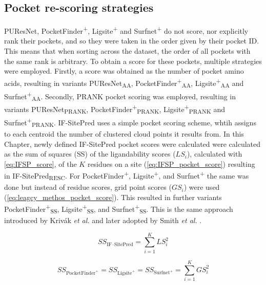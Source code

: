 \subsection{Pocket re-scoring strategies}

PUResNet, PocketFinder\textsuperscript{+}, Ligsite\textsuperscript{+} and Surfnet\textsuperscript{+} do not score, nor explicitly rank their pockets, and so they were taken in the order given by their pocket ID. This means that when sorting across the dataset, the order of all pockets with the same rank is arbitrary. To obtain a score for these pockets, multiple strategies were employed. Firstly, a score was obtained as the number of pocket amino acids, resulting in variants PUResNet\textsubscript{AA}, PocketFinder\textsuperscript{+}\textsubscript{AA}, Ligsite\textsuperscript{+}\textsubscript{AA} and Surfnet\textsuperscript{+}\textsubscript{AA}. Secondly, PRANK pocket scoring was employed, resulting in variants PUResNet\textsubscript{PRANK}, PocketFinder\textsuperscript{+}\textsubscript{PRANK}, Ligsite\textsuperscript{+}\textsubscript{PRANK} and Surfnet\textsuperscript{+}\textsubscript{PRANK}. IF-SitePred uses a simple pocket scoring scheme, whtih assigns to each centroid the number of clustered cloud points it results from. In this Chapter, newly defined IF-SitePred pocket scores were calculated were calculated as the sum of squares (SS) of the ligandability scores ($LS_{i}$), calculated with \autoref{eq:IFSP_score}, of the $K$ residues on a site (\autoref{eq:IFSP_pocket_score}) resulting in IF-SitePred\textsubscript{RESC}. For PocketFinder\textsuperscript{+}, Ligsite\textsuperscript{+}, and Surfnet\textsuperscript{+} the same was done but instead of residue scores, grid point scores ($GS_{i}$) were used (\autoref{eq:leagcy_methos_pocket_score}). This resulted in further variants PocketFinder\textsuperscript{+}\textsubscript{SS}, Ligsite\textsuperscript{+}\textsubscript{SS}, and Surfnet\textsuperscript{+}\textsubscript{SS}. This is the same approach introduced by Krivák \textit{et al.} \cite{KRIVAK_2015_P2RANK} and later adopted by Smith \textit{et al.} \cite{SMITH_2024_GrASP}.

\begin{equation}
SS_{\text{IF--SitePred}} = \sum_{i=1}^{K} LS_i^2
\label{eq:IFSP_pocket_score}
\end{equation}

\begin{equation}
SS_{\text{PocketFinder}^+} = SS_{\text{Ligsite}^+} = SS_{\text{Surfnet}^+} = \sum_{i=1}^{K} GS_i^2
\label{eq:leagcy_methos_pocket_score}
\end{equation}

